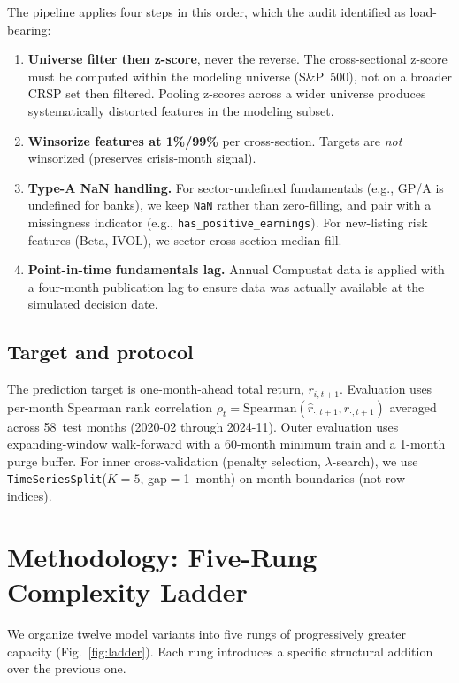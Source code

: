 \documentclass[11pt]{article}
\begin{document}
The pipeline applies four steps in this order, which the audit identified
as load-bearing:

\begin{enumerate}[leftmargin=2em,topsep=2pt,itemsep=2pt]
\item \textbf{Universe filter then z-score}, never the reverse. The
  cross-sectional z-score must be computed within the modeling universe
  (S\&P~500), not on a broader CRSP set then filtered. Pooling z-scores
  across a wider universe produces systematically distorted features
  in the modeling subset.
\item \textbf{Winsorize features at 1\%/99\%} per cross-section. Targets
  are \emph{not} winsorized (preserves crisis-month signal).
\item \textbf{Type-A NaN handling.} For sector-undefined fundamentals
  (e.g., GP/A is undefined for banks), we keep \texttt{NaN} rather than
  zero-filling, and pair with a missingness indicator (e.g.,
  \texttt{has\_positive\_earnings}). For new-listing risk features
  (Beta, IVOL), we sector-cross-section-median fill.
\item \textbf{Point-in-time fundamentals lag.} Annual Compustat data is
  applied with a four-month publication lag to ensure data was actually
  available at the simulated decision date.
\end{enumerate}

\subsection{Target and protocol}

The prediction target is one-month-ahead total return,
$r_{i,t+1}$. Evaluation uses per-month Spearman rank correlation
$\rho_t = \text{Spearman}(\hat{r}_{\cdot,t+1}, r_{\cdot,t+1})$ averaged
across 58~test months (2020-02 through 2024-11). Outer evaluation uses
expanding-window walk-forward with a 60-month minimum train and a
1-month purge buffer. For inner cross-validation (penalty selection,
$\lambda$-search), we use \texttt{TimeSeriesSplit}($K{=}5$,
gap$=$1~month) on month boundaries (not row indices).

\section{Methodology: Five-Rung Complexity Ladder}\label{sec:methodology}

We organize twelve model variants into five rungs of progressively
greater capacity (Fig.~\ref{fig:ladder}). Each rung introduces a
specific structural addition over the previous one.
\end{document}
